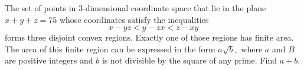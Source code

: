 The set of points in $3$-dimensional coordinate space that lie in the plane $x+y+z=75$ whose coordinates satisfy the inequalities
$$x-yz<y-zx<z-xy$$
forms three disjoint convex regions. Exactly one of those regions has finite area. The area of this finite region can be expressed in the form $a\sqrt{b},$ where $a$ and $B$ are positive integers and $b$ is not divisible by the square of any prime. Find $a+b.$